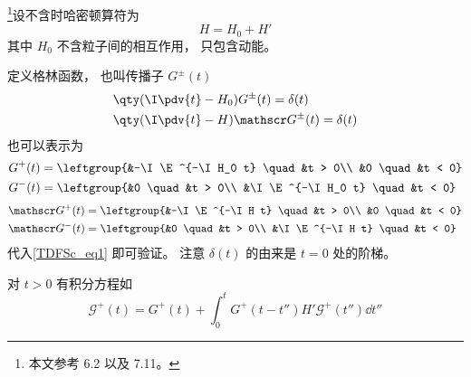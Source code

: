 
\footnote{本文参考 \cite{Newton} 6.2 以及 \cite{Sakurai} 7.11。}设不含时哈密顿算符为
\begin{equation}
H = H_0 + H'
\end{equation}
其中 $H_0$ 不含粒子间的相互作用， 只包含动能。

定义格林函数， 也叫传播子 $G^\pm(t)$
\begin{equation}\label{TDFSc_eq1}
\begin{aligned}
&\qty(\I\pdv{t} - H_0)G^\pm (t) = \delta(t)\\
&\qty(\I\pdv{t} - H)\mathscr G^\pm (t) = \delta(t)
\end{aligned}
\end{equation}
也可以表示为
\begin{equation}
\begin{aligned}
&G^+(t) = \leftgroup{&-\I \E^{-\I H_0 t} \quad &t > 0\\
&0 \quad &t < 0}\\
&G^-(t) = \leftgroup{&0 \quad &t > 0\\
&\I \E^{-\I H_0 t} \quad &t < 0}
\end{aligned}
\end{equation}
\begin{equation}
\begin{aligned}
&\mathscr G^+(t) = \leftgroup{&-\I \E^{-\I H t} \quad &t > 0\\
&0 \quad &t < 0}\\
&\mathscr G^-(t) = \leftgroup{&0 \quad &t > 0\\
&\I \E^{-\I H t} \quad &t < 0}
\end{aligned}
\end{equation}
代入\autoref{TDFSc_eq1} 即可验证。 注意 $\delta(t)$ 的由来是 $t=0$ 处的阶梯。

对 $t>0$ 有积分方程如
\begin{equation}
\mathscr G^+(t) = G^+(t) + \int_0^t G^+(t-t'')H'\mathscr G^+(t'')\dd{t''}
\end{equation}
